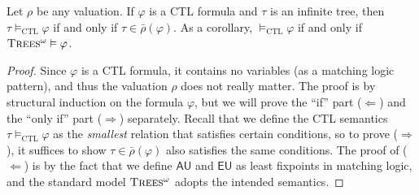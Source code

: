 \documentclass[acmsmall]{acmart}
\newcommand{\barrho}{\bar{\rho}}
\newcommand{\AU}{\mathbin{\mathsf{AU}}}
\newcommand{\EU}{\mathbin{\mathsf{EU}}}
\newcommand{\infTrees}{\textsc{Trees$^\omega$}\xspace}
\newcommand{\CTL}{\mathrm{CTL}}
\begin{document}
\begin{proposition}
Let $\rho$ be any valuation.
If $\varphi$ is a CTL formula and $\tau$ is an infinite tree, then
$\tau \vDash_\CTL \varphi$ if and only if
$\tau \in \barrho(\varphi)$.
As a corollary, $\vDash_\CTL \varphi$ if and only if
$\infTrees \vDash \varphi$.
\end{proposition}
\begin{proof}
Since $\varphi$ is a CTL formula, it contains no variables
(as a matching logic pattern), and thus 
the valuation $\rho$ does not really matter.
The proof is by structural induction on the formula $\varphi$,
but we will prove the ``if'' part ($\Longleftarrow$)
and the ``only if'' part ($\Longrightarrow$) separately.
Recall that we define the CTL semantics
$\tau \vDash_\CTL \varphi$ as the \emph{smallest} relation
that satisfies certain conditions,
so to prove ($\Longrightarrow$),
it suffices to show $\tau \in \barrho(\varphi)$
also satisfies the same conditions.
The proof of ($\Longleftarrow$) is by the fact that
we define $\AU$ and $\EU$ as least fixpoints in matching logic,
and the standard model $\infTrees$ adopts the intended semantics.


\end{proof}
\end{document}

